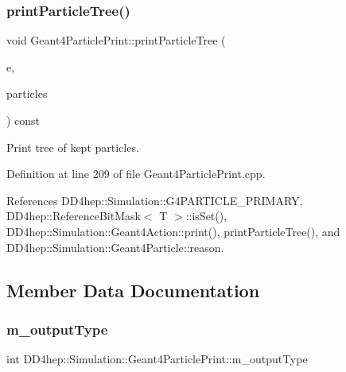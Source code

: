 \subsubsection{\texorpdfstring{print\+Particle\+Tree()}{printParticleTree()}\hspace{0.1cm}{\footnotesize\ttfamily [2/2]}}
{\footnotesize\ttfamily void Geant4\+Particle\+Print\+::print\+Particle\+Tree (\begin{DoxyParamCaption}\item[{const G4\+Event $\ast$}]{e,  }\item[{const \hyperlink{class_d_d4hep_1_1_simulation_1_1_geant4_particle_print_a1c6a9ccb9393484ee16c7cd344e20f4a}{Particle\+Map} \&}]{particles }\end{DoxyParamCaption}) const\hspace{0.3cm}{\ttfamily [protected]}}



Print tree of kept particles. 



Definition at line 209 of file Geant4\+Particle\+Print.\+cpp.



References D\+D4hep\+::\+Simulation\+::\+G4\+P\+A\+R\+T\+I\+C\+L\+E\+\_\+\+P\+R\+I\+M\+A\+RY, D\+D4hep\+::\+Reference\+Bit\+Mask$<$ T $>$\+::is\+Set(), D\+D4hep\+::\+Simulation\+::\+Geant4\+Action\+::print(), print\+Particle\+Tree(), and D\+D4hep\+::\+Simulation\+::\+Geant4\+Particle\+::reason.



\subsection{Member Data Documentation}
\hypertarget{class_d_d4hep_1_1_simulation_1_1_geant4_particle_print_a0dc2b81ac74da2e496892d9cccf30f56}{}\label{class_d_d4hep_1_1_simulation_1_1_geant4_particle_print_a0dc2b81ac74da2e496892d9cccf30f56} 
\subsubsection{\texorpdfstring{m\+\_\+output\+Type}{m\_outputType}}
{\footnotesize\ttfamily int D\+D4hep\+::\+Simulation\+::\+Geant4\+Particle\+Print\+::m\+\_\+output\+Type\hspace{0.3cm}{\ttfamily [protected]}}



